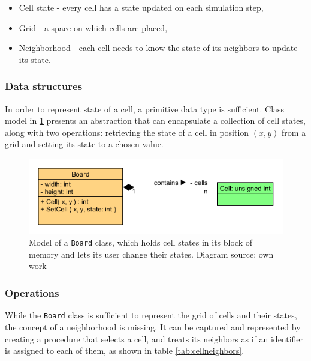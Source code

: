 \documentclass[12pt]{report}
\begin{document}
\begin{itemize}
	\item Cell state - every cell has a state updated on each simulation step,
	\item Grid - a space on which cells are placed,
	\item Neighborhood - each cell needs to know the state of its neighbors to update its state.
\end{itemize}

\subsubsection{Data structures}
In order to represent state of a cell, a primitive data type is sufficient. Class model in \cref{fig:boardcell} presents an abstraction that can encapsulate a collection of cell states, along with two operations: retrieving the state of a cell in position $(x,y)$ from a grid and setting its state to a chosen value. 

\begin{figure}[H]
	\centering
	\includegraphics[width=0.8\linewidth]{diagrams/boardcell01}
	\caption{ Model of a \texttt{Board} class, which holds cell states in its block of memory and lets its user change their states. Diagram source: own work} 
	\label{fig:boardcell}
\end{figure}

\subsubsection{Operations}
While the \texttt{Board} class is sufficient to represent the grid of cells and their states, the concept of a neighborhood is missing. It can be captured and represented by creating a procedure that selects a cell, and treats its neighbors as if an identifier is assigned to each of them, as shown in table \cref{tab:cellneighbors}. 
\end{document}

